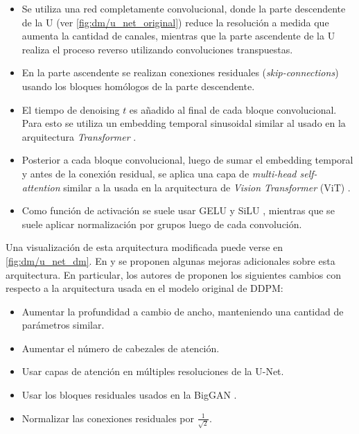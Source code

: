 \begin{itemize}
    \item Se utiliza una red completamente convolucional, donde la parte descendente de la U (ver \autoref{fig:dm/u_net_original}) reduce la resolución a medida que aumenta la cantidad de canales, mientras que la parte ascendente de la U realiza el proceso reverso utilizando convoluciones transpuestas.
    \item En la parte ascendente se realizan conexiones residuales (\textit{skip-connections}) usando los bloques homólogos de la parte descendente.
    \item El tiempo de denoising $t$ es añadido al final de cada bloque convolucional. Para esto se utiliza un embedding temporal sinusoidal similar al usado en la arquitectura \textit{Transformer} \cite{vaswani2023attention}.
    \item Posterior a cada bloque convolucional, luego de sumar el embedding temporal y antes de la conexión residual, se aplica una capa de \textit{multi-head self-attention} similar a la usada en la arquitectura de \textit{Vision Transformer} (ViT) \cite{dosovitskiy2021image}.
    \item Como función de activación se suele usar GELU \cite{hendrycks2023gaussian} y SiLU \cite{elfwing2017sigmoidweighted}, mientras que se suele aplicar normalización por grupos \cite{hafner2018tfdistvae} luego de cada convolución.
\end{itemize}

Una visualización de esta arquitectura modificada puede verse en \autoref{fig:dm/u_net_dm}. En \cite{nichol2021improved} y \cite{dhariwal2021diffusion} se proponen algunas mejoras adicionales sobre esta arquitectura. En particular, los autores de \cite{dhariwal2021diffusion} proponen los siguientes cambios con respecto a la arquitectura usada en el modelo original de DDPM:

\begin{itemize}
    \item Aumentar la profundidad a cambio de ancho, manteniendo una cantidad de parámetros similar.
    \item Aumentar el número de cabezales de atención.
    \item Usar capas de atención en múltiples resoluciones de la U-Net.
    \item Usar los bloques residuales usados en la BigGAN \cite{brock2019largescalegantraining}.
    \item Normalizar las conexiones residuales por $\frac{1}{\sqrt{2}}$.
\end{itemize}

